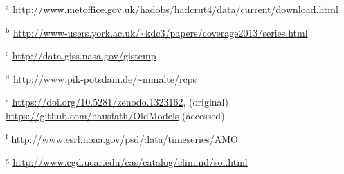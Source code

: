 \documentclass[smallextended]{svjour3}       %
\begin{document}
\begin{table}[t]
\begin{threeparttable}
\begin{tablenotes}
            \item $^\text{a}$ \url{http://www.metoffice.gov.uk/hadobs/hadcrut4/data/current/download.html}
            \item $^\text{b}$ \url{http://www-users.york.ac.uk/~kdc3/papers/coverage2013/series.html} 
            \item $^\text{c}$ \url{http://data.giss.nasa.gov/gistemp}
            \item $^\text{d}$ \url{http://www.pik-potsdam.de/~mmalte/rcps} 
            \item $^\text{e}$ \url{https://doi.org/10.5281/zenodo.1323162}, (original) \url{https://github.com/hausfath/OldModels} (accessed)
            \item $^\text{f}$ \url{http://www.esrl.noaa.gov/psd/data/timeseries/AMO}
                \item $^\text{g}$ \url{http://www.cgd.ucar.edu/cas/catalog/climind/soi.html}        
            \end{tablenotes}
    \end{threeparttable} 
\end{table}
\end{document}
